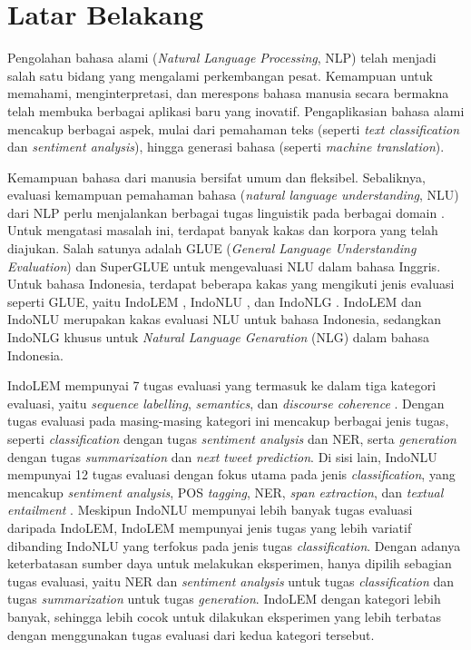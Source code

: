 \section{Latar Belakang}
\label{sec:latar-belakang}

Pengolahan bahasa alami (\textit{Natural Language Processing}, NLP) telah menjadi salah satu bidang yang mengalami perkembangan pesat. Kemampuan untuk memahami, menginterpretasi, dan merespons bahasa manusia secara bermakna telah membuka berbagai aplikasi baru yang inovatif. Pengaplikasian bahasa alami mencakup berbagai aspek, mulai dari pemahaman teks (seperti \textit{text classification} dan \textit{sentiment analysis}), hingga generasi bahasa (seperti \textit{machine translation}).

Kemampuan bahasa dari manusia bersifat umum dan fleksibel. Sebaliknya, evaluasi kemampuan pemahaman bahasa (\textit{natural language understanding}, NLU) dari NLP perlu menjalankan berbagai tugas linguistik pada berbagai domain \parencite{glue}. Untuk mengatasi masalah ini, terdapat banyak kakas dan korpora yang telah diajukan. Salah satunya adalah GLUE (\textit{General Language Understanding Evaluation}) \parencite{glue} dan SuperGLUE \parencite{superglue} untuk mengevaluasi NLU dalam bahasa Inggris. Untuk bahasa Indonesia, terdapat beberapa kakas yang mengikuti jenis evaluasi seperti GLUE, yaitu IndoLEM \parencite{indolem}, IndoNLU \parencite{indonlu}, dan IndoNLG \parencite{indonlg}. IndoLEM dan IndoNLU merupakan kakas evaluasi NLU untuk bahasa Indonesia, sedangkan IndoNLG khusus untuk \textit{Natural Language Genaration} (NLG) dalam bahasa Indonesia.

IndoLEM mempunyai 7 tugas evaluasi yang termasuk ke dalam tiga kategori evaluasi, yaitu \textit{sequence labelling}, \textit{semantics}, dan \textit{discourse coherence} \parencite{indolem}. Dengan tugas evaluasi pada masing-masing kategori ini mencakup berbagai jenis tugas, seperti \textit{classification} dengan tugas \textit{sentiment analysis} dan NER, serta \textit{generation} dengan tugas \textit{summarization} dan \textit{next tweet prediction}. Di sisi lain, IndoNLU mempunyai 12 tugas evaluasi dengan fokus utama pada jenis \textit{classification}, yang mencakup \textit{sentiment analysis}, POS \textit{tagging}, NER, \textit{span extraction}, dan \textit{textual entailment} \parencite{indonlu}. Meskipun IndoNLU mempunyai lebih banyak tugas evaluasi daripada IndoLEM, IndoLEM mempunyai jenis tugas yang lebih variatif dibanding IndoNLU yang terfokus pada jenis tugas \textit{classification}. Dengan adanya keterbatasan sumber daya untuk melakukan eksperimen, hanya dipilih sebagian tugas evaluasi, yaitu NER dan \textit{sentiment analysis} untuk tugas \textit{classification} dan tugas \textit{summarization} untuk tugas \textit{generation}. IndoLEM dengan kategori lebih banyak, sehingga lebih cocok untuk dilakukan eksperimen yang lebih terbatas dengan menggunakan tugas evaluasi dari kedua kategori tersebut.

